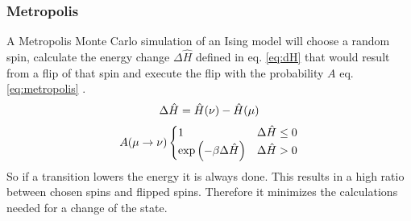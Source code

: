     \subsubsection{Metropolis}
        A Metropolis Monte Carlo\cite{Metropolis1953} simulation of an
        Ising model will choose a random spin, calculate the energy change
        \(\Delta \hat H\) defined in eq. \eqref{eq:dH} that would result
        from a flip of that spin and execute the flip with the probability \(A\)
        eq. \eqref{eq:metropolis} \cite{NewmanBarkema1999} \cite{Katzgraber2011}.
        \begin{equation}
            \Delta \hat H = \hat H(\nu) - \hat H(\mu)\\
            \label{eq:dH}
        \end{equation}
        \begin{equation}
            A(\mu \to \nu)
            \begin{cases}
                1                                 & \Delta \hat H \le 0 \\
                \exp{\ensuremath{\left(-\beta \Delta \hat H\right)}} & \Delta \hat H > 0
            \end{cases}
            \label{eq:metropolis}
        \end{equation}
        So if a transition lowers the energy it is always done. This
        results in a high ratio between chosen spins and flipped spins.
        Therefore it minimizes the calculations needed for a change of
        the state.

